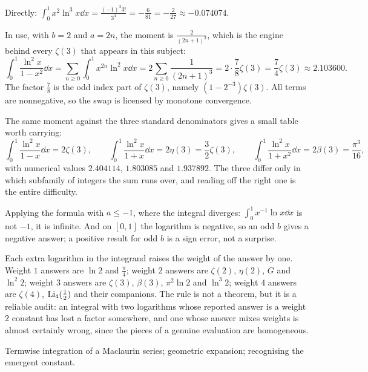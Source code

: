 \begin{worked}
Directly: $\int_0^1x^{2}\ln^{3}x\dd x=\frac{(-1)^{3}3!}{3^{4}}=-\frac{6}{81}=-\frac{2}{27}\approx-0.074074$.

In use, with $b=2$ and $a=2n$, the moment is $\frac{2}{(2n+1)^{3}}$, which is the engine behind every $\zeta(3)$ that appears in this subject:
\[\int_0^1\frac{\ln^{2}x}{1-x^{2}}\dd x=\sum_{n\geq0}\int_0^1x^{2n}\ln^{2}x\dd x=2\sum_{n\geq0}\frac{1}{(2n+1)^{3}}=2\cdot\frac78\zeta(3)=\frac{7}{4}\zeta(3)\approx2.103600.\]
The factor $\tfrac78$ is the odd index part of $\zeta(3)$, namely $(1-2^{-3})\zeta(3)$. All terms are nonnegative, so the swap is licensed by monotone convergence.

The same moment against the three standard denominators gives a small table worth carrying:
\[\int_0^1\frac{\ln^{2}x}{1-x}\dd x=2\zeta(3),\qquad \int_0^1\frac{\ln^{2}x}{1+x}\dd x=2\eta(3)=\frac32\zeta(3),\qquad \int_0^1\frac{\ln^{2}x}{1+x^{2}}\dd x=2\beta(3)=\frac{\pi^{3}}{16},\]
with numerical values $2.404114$, $1.803085$ and $1.937892$. The three differ only in which subfamily of integers the sum runs over, and reading off the right one is the entire difficulty.
\end{worked}

\begin{trap}
Applying the formula with $a\leq-1$, where the integral diverges: $\int_0^1x^{-1}\ln x\dd x$ is not $-1$, it is infinite. And on $[0,1]$ the logarithm is negative, so an odd $b$ gives a negative answer; a positive result for odd $b$ is a sign error, not a surprise.
\end{trap}

\begin{keynote}
Each extra logarithm in the integrand raises the weight of the answer by one. Weight $1$ answers are $\ln2$ and $\tfrac{\pi}{4}$; weight $2$ answers are $\zeta(2)$, $\eta(2)$, $G$ and $\ln^{2}2$; weight $3$ answers are $\zeta(3)$, $\beta(3)$, $\pi^{2}\ln2$ and $\ln^{3}2$; weight $4$ answers are $\zeta(4)$, $\operatorname{Li}_4(\tfrac12)$ and their companions. The rule is not a theorem, but it is a reliable audit: an integral with two logarithms whose reported answer is a weight $2$ constant has lost a factor somewhere, and one whose answer mixes weights is almost certainly wrong, since the pieces of a genuine evaluation are homogeneous.
\end{keynote}

\begin{seealsob}Termwise integration of a Maclaurin series; geometric expansion; recognising the emergent constant.\end{seealsob}

